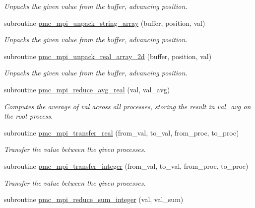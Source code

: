 \begin{DoxyCompactItemize}
\begin{DoxyCompactList}\small\item\em Unpacks the given value from the buffer, advancing position. \end{DoxyCompactList}\item 
subroutine \mbox{\hyperlink{namespacepmc__mpi_a6c069e4ccb7fa809e8b5ff2a4ec4d6c5}{pmc\+\_\+mpi\+\_\+unpack\+\_\+string\+\_\+array}} (buffer, position, val)
\begin{DoxyCompactList}\small\item\em Unpacks the given value from the buffer, advancing position. \end{DoxyCompactList}\item 
subroutine \mbox{\hyperlink{namespacepmc__mpi_acbfc2d34ae601607a3e17e33bff99aaa}{pmc\+\_\+mpi\+\_\+unpack\+\_\+real\+\_\+array\+\_\+2d}} (buffer, position, val)
\begin{DoxyCompactList}\small\item\em Unpacks the given value from the buffer, advancing position. \end{DoxyCompactList}\item 
subroutine \mbox{\hyperlink{namespacepmc__mpi_a0e9ea8ed3344fb38998a03e334c25a79}{pmc\+\_\+mpi\+\_\+reduce\+\_\+avg\+\_\+real}} (val, val\+\_\+avg)
\begin{DoxyCompactList}\small\item\em Computes the average of val across all processes, storing the result in val\+\_\+avg on the root process. \end{DoxyCompactList}\item 
subroutine \mbox{\hyperlink{namespacepmc__mpi_a2be14fe37f7d3675ae0d59207d8cc3b1}{pmc\+\_\+mpi\+\_\+transfer\+\_\+real}} (from\+\_\+val, to\+\_\+val, from\+\_\+proc, to\+\_\+proc)
\begin{DoxyCompactList}\small\item\em Transfer the value between the given processes. \end{DoxyCompactList}\item 
subroutine \mbox{\hyperlink{namespacepmc__mpi_a422d1ad4201ca47561e99dcc594207a3}{pmc\+\_\+mpi\+\_\+transfer\+\_\+integer}} (from\+\_\+val, to\+\_\+val, from\+\_\+proc, to\+\_\+proc)
\begin{DoxyCompactList}\small\item\em Transfer the value between the given processes. \end{DoxyCompactList}\item 
subroutine \mbox{\hyperlink{namespacepmc__mpi_ab78b8cedd338fe1f9e39a7a3b6ebee7c}{pmc\+\_\+mpi\+\_\+reduce\+\_\+sum\+\_\+integer}} (val, val\+\_\+sum)

\end{DoxyCompactItemize}
